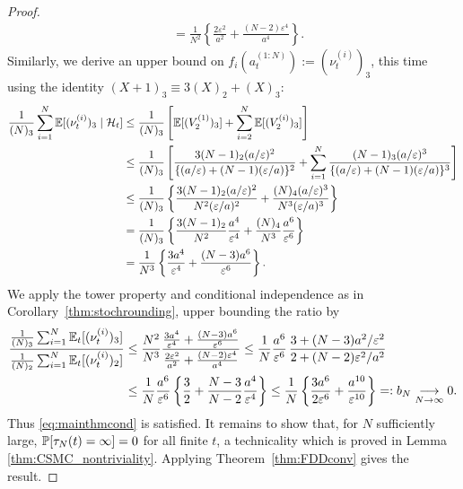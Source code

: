 \begin{proof}
\begin{align}
&= \frac{1}{N^2} \left\{\frac{2\varepsilon^2}{a^2} + \frac{(N-2)\varepsilon^4}{a^4}  \right\} . \label{eq:CSMC_cN_LB}
\end{align}
Similarly, we derive an upper bound on $f_i(a_t^{(1:N)}) := (\nu_t^{(i)})_3$, this time using the identity $(X+1)_3 \equiv 3(X)_2 +(X)_3 $:
\begin{align*}
\frac{1}{(N)_3} \sum_{i=1}^N \mathbb{E}[ (\nu_t^{(i)})_3 \mid \mathcal{H}_t]
&\leq \frac{1}{(N)_3} \left[ \mathbb{E}[ (V_2^{(1)})_3 ] + \sum_{i=2}^N \mathbb{E}[ (V_2^{(i)})_3 ] \right] \\
&\leq \frac{1}{(N)_3} \left[ \frac{ 3 (N-1)_2 (a/\varepsilon)^2}{\{(a/\varepsilon) + (N-1)(\varepsilon/a)\}^2} + \sum_{i=1}^N \frac{(N-1)_3 (a/\varepsilon)^3}{\{(a/\varepsilon) + (N-1)(\varepsilon/a)\}^3} \right] \\
&\leq \frac{1}{(N)_3} \left\{ \frac{3(N-1)_2 (a/\varepsilon)^2}{N^2 (\varepsilon/a)^2} + \frac{(N)_4 (a/\varepsilon)^3}{N^3 (\varepsilon/a)^3} \right\} \\
&= \frac{1}{(N)_3} \left\{ \frac{3(N-1)_2}{N^2} \frac{a^4}{\varepsilon^4} +\frac{(N)_4}{N^3} \frac{a^6}{\varepsilon^6} \right\} \\
&= \frac{1}{N^3} \left\{ \frac{3a^4}{\varepsilon^4} + \frac{(N-3) a^6}{\varepsilon^6} \right\} .
\end{align*}
We apply the tower property and conditional independence as in Corollary~\ref{thm:stochrounding}, upper bounding the ratio by
\begin{align*}
\frac{\frac{1}{(N)_3} \sum_{i=1}^N \mathbb{E}_t[ (\nu_t^{(i)})_3 ]}{\frac{1}{(N)_2} \sum_{i=1}^N \mathbb{E}_t[ (\nu_t^{(i)})_2 ]}
&\leq \frac{N^2}{N^3} \frac{ \frac{3a^4}{\varepsilon^4} + \frac{(N-3)a^6}{\varepsilon^6} }{ \frac{2\varepsilon^2}{a^2} + \frac{(N-2)\varepsilon^4}{a^4} }
\leq \frac{1}{N} \frac{a^6}{\varepsilon^6}\, \frac{3 + (N-3) a^2 / \varepsilon^2 }{2 + (N-2) \varepsilon^2 / a^2} \\
&\leq \frac{1}{N} \frac{a^6}{\varepsilon^6} \left\{ \frac{3}{2} + \frac{N-3}{N-2} \frac{a^4}{\varepsilon^4} \right\}
\leq \frac{1}{N} \left\{ \frac{3 a^6}{2 \varepsilon^6} + \frac{a^{10}}{\varepsilon^{10}} \right\}
=: b_N \underset{N\to\infty}{\longrightarrow} 0.
\end{align*}
Thus \eqref{eq:mainthmcond} is satisfied. It remains to show that, for $N$ sufficiently large, $\mathbb{P}[ \tau_N(t) = \infty ] =0$ for all finite $t$, a technicality which is proved in Lemma \ref{thm:CSMC_nontriviality}. Applying Theorem~\ref{thm:FDDconv} gives the result.
\end{proof}




